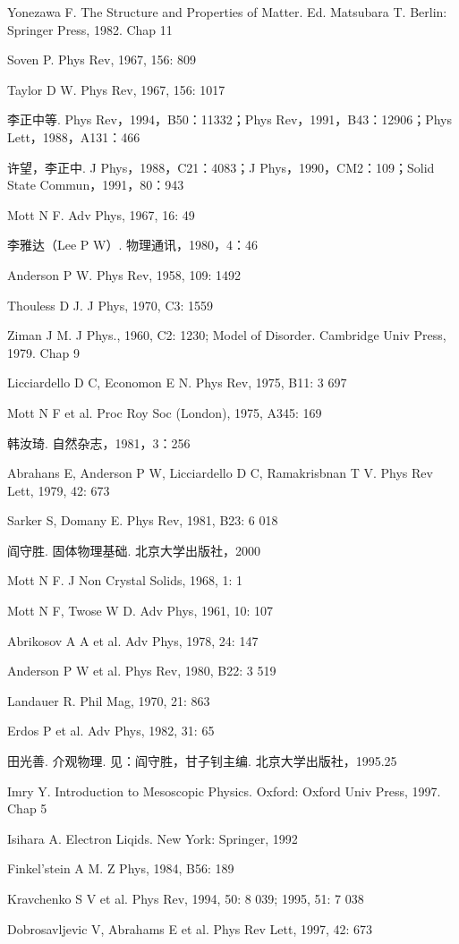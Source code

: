\begin{canKao}
\begin{enumerate}[label={[\arabic*]}, leftmargin=2.2em, itemsep=0pt]
\item Yonezawa F. The Structure and Properties of Matter. Ed. Matsubara T. Berlin: Springer Press, 1982. Chap 11
\item Soven P. Phys Rev, 1967, 156: 809
\item Taylor D W. Phys Rev, 1967, 156: 1017
\item 李正中等. Phys Rev，1994，B50：11332；Phys Rev，1991，B43：12906；Phys Lett，1988，A131：466
\item 许望，李正中. J Phys，1988，C21：4083；J Phys，1990，CM2：109；Solid State Commun，1991，80：943
\item Mott N F. Adv Phys, 1967, 16: 49
\item 李雅达（Lee P W）. 物理通讯，1980，4：46
\item Anderson P W. Phys Rev, 1958, 109: 1492
\item Thouless D J. J Phys, 1970, C3: 1559
\item Ziman J M. J Phys., 1960, C2: 1230; Model of Disorder. Cambridge Univ Press, 1979. Chap 9
\item Licciardello D C, Economon E N. Phys Rev, 1975, B11: 3 697
\item Mott N F et al. Proc Roy Soc (London), 1975, A345: 169
\item 韩汝琦. 自然杂志，1981，3：256
\item Abrahans E, Anderson P W, Licciardello D C, Ramakrisbnan T V. Phys Rev Lett, 1979, 42: 673
\item Sarker S, Domany E. Phys Rev, 1981, B23: 6 018
\item 阎守胜. 固体物理基础. 北京大学出版社，2000
\item Mott N F. J Non Crystal Solids, 1968, 1: 1
\item Mott N F, Twose W D. Adv Phys, 1961, 10: 107
\item Abrikosov A A et al. Adv Phys, 1978, 24: 147
\item Anderson P W et al. Phys Rev, 1980, B22: 3 519
\item Landauer R. Phil Mag, 1970, 21: 863
\item Erdos P et al. Adv Phys, 1982, 31: 65
\item 田光善. 介观物理. 见：阎守胜，甘子钊主编. 北京大学出版社，1995.25
\item Imry Y. Introduction to Mesoscopic Physics. Oxford: Oxford Univ Press, 1997. Chap 5
\item Isihara A. Electron Liqids. New York: Springer, 1992
\item Finkel'stein A M. Z Phys, 1984, B56: 189
\item Kravchenko S V et al. Phys Rev, 1994, 50: 8 039; 1995, 51: 7 038
\item Dobrosavljevic V, Abrahams E et al. Phys Rev Lett, 1997, 42: 673
\end{enumerate}
\end{canKao}
